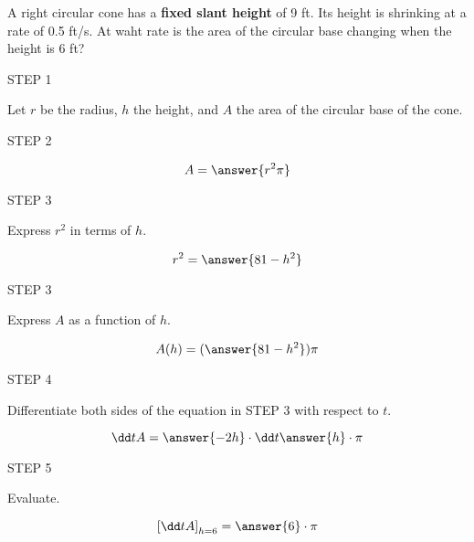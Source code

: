 \documentclass{ximera}
\author{Nela Lakos}
\begin{document}
\begin{exercise}

A right circular cone has a \textbf{fixed slant height} of  9 ft.  Its height is shrinking
at a rate of 0.5 ft/s. At waht rate is the area of the circular base changing
when the height is 6 ft?


STEP 1 

 Let  $r$ be the radius, $h$ the height, and $A$ the area of the circular base of the cone.




\begin{hint}
\begin{image}
\end{image}
\end{hint}



STEP 2

 \[
 A=\answer{r^{2}\pi}
 \]
 
 STEP 3
 
 Express $r^2$ in terms of $h$.
 
  \[
 r^2=\answer{81-h^2}
 \]

STEP 3

Express $A$ as a function of $h$.

 \[
 A(h)=(\answer{81-h^2})\pi
 \]
 
 
 STEP 4
 
 Differentiate both sides of the equation  in STEP 3 with respect to $t$.
 
  \[
 \dd t {A}=\answer{-2 h}\cdot  \dd t {\answer{h}}\cdot\pi
 \]
 
 
 STEP 5
 
 Evaluate.
 
  \[
\left[ \dd t {A}\right]_{h=6}=\answer{6}\cdot\pi
 \]
 
\end{exercise}
\end{document}
